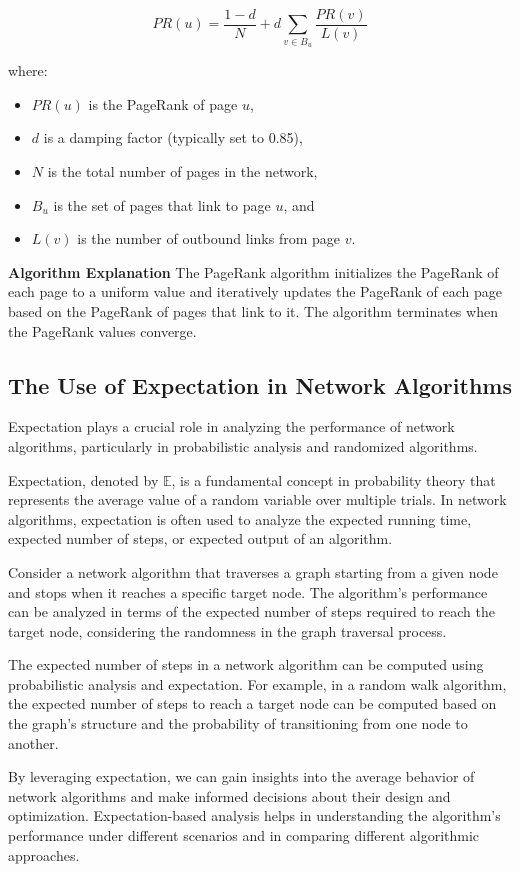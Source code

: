 \documentclass[12pt]{book} %
\begin{document}
\[
PR(u) = \frac{1 - d}{N} + d \sum_{v \in B_u} \frac{PR(v)}{L(v)}
\]

where:
\begin{itemize}
    \item \(PR(u)\) is the PageRank of page \(u\),
    \item \(d\) is a damping factor (typically set to 0.85),
    \item \(N\) is the total number of pages in the network,
    \item \(B_u\) is the set of pages that link to page \(u\), and
    \item \(L(v)\) is the number of outbound links from page \(v\).
\end{itemize}

\textbf{Algorithm Explanation}
The PageRank algorithm initializes the PageRank of each page to a uniform value and iteratively updates the PageRank of each page based on the PageRank of pages that link to it. The algorithm terminates when the PageRank values converge.

\subsection{The Use of Expectation in Network Algorithms}
Expectation plays a crucial role in analyzing the performance of network algorithms, particularly in probabilistic analysis and randomized algorithms.

Expectation, denoted by \(\mathbb{E}\), is a fundamental concept in probability theory that represents the average value of a random variable over multiple trials. In network algorithms, expectation is often used to analyze the expected running time, expected number of steps, or expected output of an algorithm.

Consider a network algorithm that traverses a graph starting from a given node and stops when it reaches a specific target node. The algorithm's performance can be analyzed in terms of the expected number of steps required to reach the target node, considering the randomness in the graph traversal process.

The expected number of steps in a network algorithm can be computed using probabilistic analysis and expectation. For example, in a random walk algorithm, the expected number of steps to reach a target node can be computed based on the graph's structure and the probability of transitioning from one node to another.

By leveraging expectation, we can gain insights into the average behavior of network algorithms and make informed decisions about their design and optimization. Expectation-based analysis helps in understanding the algorithm's performance under different scenarios and in comparing different algorithmic approaches.
\end{document}

